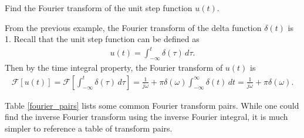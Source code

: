 \documentclass{report}
\begin{document}
\begin{example}
    Find the Fourier transform of the unit step function $u(t)$.
\end{example}
\begin{solution}
    From the previous example, the Fourier transform of the delta function $\delta(t)$ is 1. 
    Recall that the unit step function can be defined as
    \begin{align*}
        u(t) = \int_{-\infty}^{t} \delta(\tau) \,d\tau.
    \end{align*}
    Then by the time integral property, the Fourier transform of $u(t)$ is 
    \begin{align*}
        \mathcal{F}[u(t)] = \mathcal{F}\left[\int_{-\infty}^{t} \delta(\tau) \,d\tau\right] = \frac{1}{j\omega} + \pi\delta(\omega)\int_{-\infty}^{\infty}\delta(t) \,dt = \frac{1}{j\omega} + \pi\delta(\omega).
    \end{align*}
\end{solution}
Table \ref{fourier_pairs} lists some common Fourier transform pairs. While one could find the inverse Fourier transform using the inverse Fourier integral, 
it is much simpler to reference a table of transform pairs.
\end{document}
